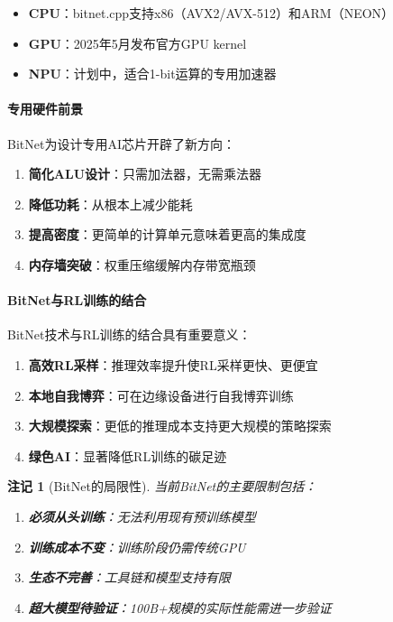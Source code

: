 \documentclass[12pt,a4paper]{article}
\newtheorem{remark}[theorem]{注记}
\begin{document}
\begin{itemize}
    \item \textbf{CPU}：bitnet.cpp支持x86（AVX2/AVX-512）和ARM（NEON）
    \item \textbf{GPU}：2025年5月发布官方GPU kernel
    \item \textbf{NPU}：计划中，适合1-bit运算的专用加速器
\end{itemize}

\paragraph{专用硬件前景}

BitNet为设计专用AI芯片开辟了新方向：

\begin{enumerate}
    \item \textbf{简化ALU设计}：只需加法器，无需乘法器
    \item \textbf{降低功耗}：从根本上减少能耗
    \item \textbf{提高密度}：更简单的计算单元意味着更高的集成度
    \item \textbf{内存墙突破}：权重压缩缓解内存带宽瓶颈
\end{enumerate}

\paragraph{BitNet与RL训练的结合}

BitNet技术与RL训练的结合具有重要意义：

\begin{enumerate}
    \item \textbf{高效RL采样}：推理效率提升使RL采样更快、更便宜
    \item \textbf{本地自我博弈}：可在边缘设备进行自我博弈训练
    \item \textbf{大规模探索}：更低的推理成本支持更大规模的策略探索
    \item \textbf{绿色AI}：显著降低RL训练的碳足迹
\end{enumerate}

\begin{remark}[BitNet的局限性]
当前BitNet的主要限制包括：
\begin{enumerate}
    \item \textbf{必须从头训练}：无法利用现有预训练模型
    \item \textbf{训练成本不变}：训练阶段仍需传统GPU
    \item \textbf{生态不完善}：工具链和模型支持有限
    \item \textbf{超大模型待验证}：100B+规模的实际性能需进一步验证
\end{enumerate}
\end{remark}
\end{document}
